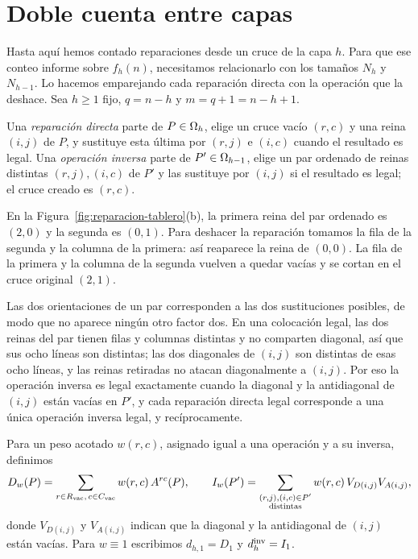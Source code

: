 \section{Doble cuenta entre capas}\label{sec:doblecuenta}

Hasta aquí hemos contado reparaciones desde un cruce de la capa $h$. Para que
ese conteo informe sobre $f_h(n)$, necesitamos relacionarlo con los tamaños
$N_h$ y $N_{h-1}$. Lo hacemos emparejando cada reparación directa con la operación
que la deshace. Sea $h\ge1$ fijo, $q=n-h$ y $m=q+1=n-h+1$.

\begin{definicion}\label{def:reparaciones}
Una \emph{reparación directa} parte de $P\in\Omega_h$, elige un cruce vacío $(r,c)$ y una reina
$(i,j)$ de $P$, y sustituye esta última por $(r,j)$ e $(i,c)$ cuando el resultado es legal. Una
\emph{operación inversa} parte de $P'\in\Omega_{h-1}$, elige un par ordenado de reinas distintas
$(r,j),(i,c)$ de $P'$ y las sustituye por $(i,j)$ si el resultado es legal; el cruce creado es
$(r,c)$.
\end{definicion}

En la Figura~\ref{fig:reparacion-tablero}(b), la primera reina del par ordenado
es $(2,0)$ y la segunda es $(0,1)$. Para deshacer la reparación tomamos la fila
de la segunda y la columna de la primera: así reaparece la reina de $(0,0)$.
La fila de la primera y la columna de la segunda vuelven a quedar vacías y
se cortan en el cruce original $(2,1)$.

Las dos orientaciones de un par corresponden a las dos sustituciones posibles, de modo que no
aparece ningún otro factor dos. En una colocación legal, las dos reinas del par tienen filas y
columnas distintas y no comparten diagonal, así que sus ocho líneas son distintas; las dos
diagonales de $(i,j)$ son distintas de esas ocho líneas, y las reinas retiradas no atacan
diagonalmente a $(i,j)$. Por eso la operación inversa es legal exactamente cuando la diagonal y
la antidiagonal de $(i,j)$ están vacías en $P'$, y cada reparación directa legal corresponde a
una única operación inversa legal, y recíprocamente.

Para un peso acotado $w(r,c)$, asignado igual a una operación y a su inversa, definimos
\[
 D_w(P)=\sum_{r\in R_{\mathrm{vac}},\,c\in C_{\mathrm{vac}}}w(r,c)\,A^{rc}(P),\qquad
 I_w(P')=\sum_{\substack{(r,j),(i,c)\in P'\\ \text{distintas}}}w(r,c)\,V_{D(i,j)}V_{A(i,j)},
\]
donde $V_{D(i,j)}$ y $V_{A(i,j)}$ indican que la diagonal y la antidiagonal de $(i,j)$ están
vacías. Para $w\equiv1$ escribimos $d_{h,1}=D_1$ y $d_h^{\mathrm{inv}}=I_1$.

